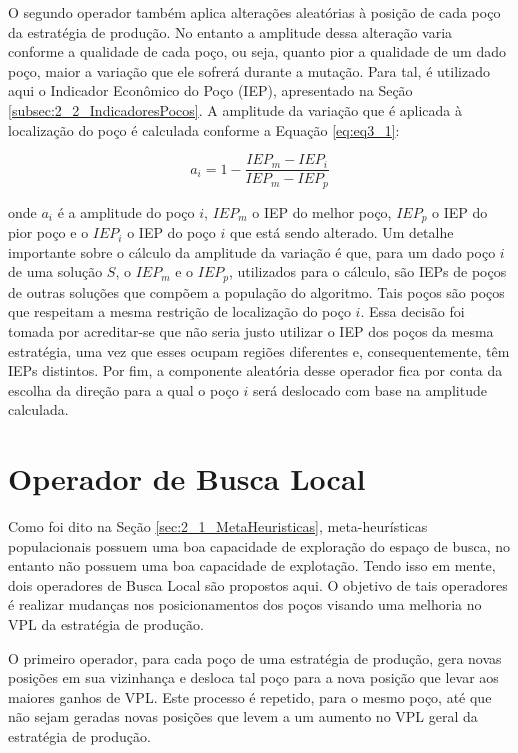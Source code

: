 O segundo operador também aplica alterações aleatórias à posição de cada poço da estratégia de produção. No entanto a amplitude dessa alteração varia conforme a qualidade de cada poço, ou seja, quanto pior a qualidade de um dado poço, maior a variação que ele sofrerá durante a mutação. Para tal, é utilizado aqui o Indicador Econômico do Poço (IEP), apresentado na Seção \ref{subsec:2_2_IndicadoresPocos}. A amplitude da variação que é aplicada à localização do poço é calculada conforme a Equação \ref{eq:eq3_1}:

\begin{equation}
  \label{eq:eq3_1}
  a_i = 1 - \frac{IEP_m -IEP_i}{IEP_m -IEP_p}
\end{equation}

\noindent onde $a_i$ é a amplitude do poço $i$, $IEP_m$ o IEP do melhor poço, $IEP_p$ o IEP do pior poço e o $IEP_i$  o IEP do poço $i$ que está sendo alterado. Um detalhe importante sobre o cálculo da amplitude da variação é que, para um dado poço $i$ de uma solução $S$, o $IEP_m$ e o $IEP_p$, utilizados para o cálculo, são IEPs de poços de outras soluções que compõem a população do algoritmo. Tais poços são poços que respeitam a mesma restrição de localização do poço $i$. Essa decisão foi tomada por acreditar-se que não seria justo utilizar o IEP dos poços da mesma estratégia, uma vez que esses ocupam regiões diferentes e, consequentemente, têm IEPs distintos. Por fim, a componente aleatória desse operador fica por conta da escolha da direção para a qual o poço $i$ será deslocado com base na amplitude calculada.

\section{Operador de Busca Local}
\label{sec:3_OperadorBuscaLocal}
Como foi dito na Seção \ref{sec:2_1_MetaHeuristicas}, meta-heurísticas populacionais possuem uma boa capacidade de exploração do espaço de busca, no entanto não possuem uma boa capacidade de explotação. Tendo isso em mente, dois operadores de Busca Local são propostos aqui. O objetivo de tais operadores é realizar mudanças nos posicionamentos dos poços visando uma melhoria no VPL da estratégia de produção.

O primeiro operador, para cada poço de uma estratégia de produção, gera novas posições em sua vizinhança e desloca tal poço para a nova posição que levar aos maiores ganhos de VPL. Este processo é repetido, para o mesmo poço, até que não sejam geradas novas posições que levem a um aumento no VPL geral da estratégia de produção.

